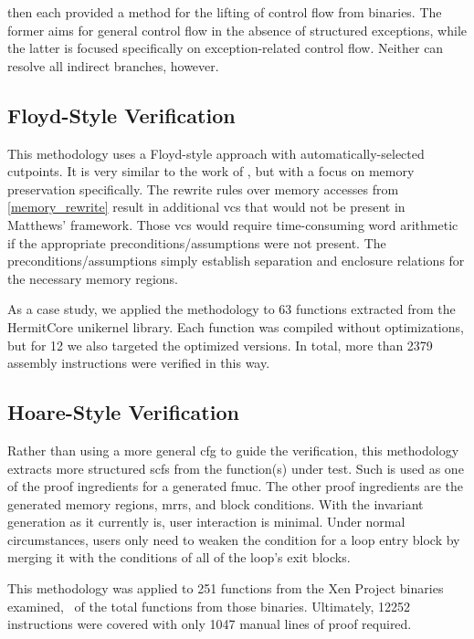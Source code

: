  then each provided a method for the lifting of control flow from binaries.
The former aims for general control flow in the absence of structured exceptions, while the latter is focused specifically on exception-related control flow.
Neither can resolve all indirect branches, however.

\subsection{Floyd-Style Verification}
This methodology uses a Floyd-style approach \autocite{floyd1967assigning}
with automatically-selected cutpoints.
It is very similar to the work of \textcite{matthews2006verification},
but with a focus on memory preservation specifically.
The rewrite rules over memory accesses from \cref{memory_rewrite}
result in additional \acp{vc} that would not be present in Matthews' framework.
Those \acp{vc} would require time-consuming word arithmetic if the appropriate preconditions/assumptions were not present.
The preconditions/assumptions simply establish separation and enclosure relations for the necessary memory regions.

As a case study, we applied the methodology to \num{63} functions extracted from the HermitCore unikernel library.
Each function was compiled without optimizations, but for \num{12} we also targeted the optimized versions.
In total, more than \num{2379} assembly instructions were verified in this way.

\subsection{Hoare-Style Verification}
Rather than using a more general \ac{cfg} to guide the verification,
this methodology extracts more structured \acp{scf} from the function(s) under test.
Such  is used as one of the proof ingredients for a generated \ac{fmuc}.
The other proof ingredients are the generated memory regions, \acp{mrr}, and block conditions.
With the invariant generation as it currently is, user interaction is minimal.
Under normal circumstances, users only need to weaken the condition for a loop entry block by merging it with the conditions of all of the loop's exit blocks.

This methodology was applied to \num{251} functions from the Xen Project binaries examined, \xenpercentage\ of the total functions from those binaries.
Ultimately, \num{12252} instructions were covered with only \num{1047} manual lines of proof required.

